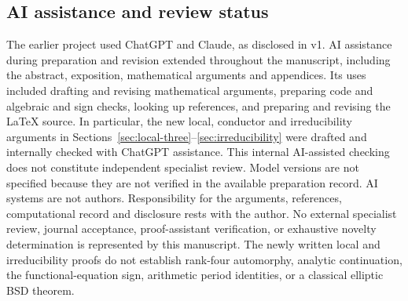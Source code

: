 \subsection*{AI assistance and review status}
The earlier project used ChatGPT and Claude, as disclosed in v1.
AI assistance during preparation and revision extended throughout the
manuscript, including the abstract, exposition, mathematical arguments
and appendices. Its uses included drafting and revising mathematical
arguments, preparing code and algebraic and sign checks, looking up
references, and preparing and revising the LaTeX source. In particular,
the new local, conductor and irreducibility arguments in
Sections~\ref{sec:local-three}--\ref{sec:irreducibility} were drafted and
internally checked with ChatGPT assistance. This internal AI-assisted
checking does not constitute independent specialist review. Model
versions are not specified because they are not verified in the
available preparation record. AI systems are not authors.
Responsibility for the arguments, references, computational record
and disclosure rests with the author. No external specialist review,
journal acceptance, proof-assistant verification, or exhaustive novelty
determination is represented by this manuscript.
The newly written local and irreducibility proofs do not establish
rank-four automorphy, analytic continuation, the functional-equation sign,
arithmetic period identities, or a classical elliptic BSD theorem.
